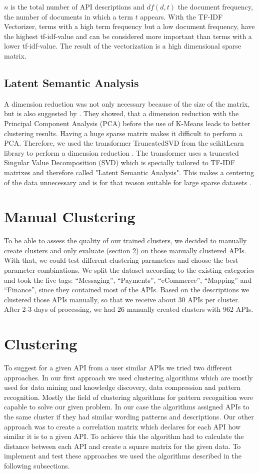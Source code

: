 \documentclass[a4paper]{IEEEtran}
\begin{document}
$n$ is the total number of API descriptions and $df(d,t)$ the document frequency, the number of documents in which a term $t$ appears. 
With the TF-IDF Vectorizer, terms with a high term frequency but a low document frequency, have the highest tf-idf-value and can be considered more important than terms with a lower tf-idf-value. The result of the vectorization is a high dimensional sparse matrix.

\subsection{Latent Semantic Analysis}
A dimension reduction was not only necessary because of the size of the matrix, but is also suggested by \cite{ding2004k}. They showed, that a dimension reduction with the Principal Component Analysis (PCA) before the use of K-Means leads to better clustering  results. Having a huge sparse matrix makes it difficult to perform a PCA. Therefore, we used the transformer TruncatedSVD from the scikitLearn library to perform a dimension reduction \cite{scikit-learn}. The transformer uses a truncated Singular Value Decomposition (SVD) which is specially tailored to TF-IDF matrixes and therefore called "Latent Semantic Analysis". This makes a centering of the data unnecessary and is for that reason suitable for large sparse datasets \cite{albright2004taming}.

\section{Manual Clustering}
To be able to assess the quality of our trained clusters, we decided to manually create clusters and only evaluate (section \ref{sec:clustering}) on those manually clustered APIs. With that, we could test different clustering parameters and choose the best parameter combinations. We split the dataset according to the existing categories and took the five tags: “Messaging”, “Payments”, “eCommerce”, “Mapping” and “Finance”, since they contained most of the APIs. Based on the descriptions we clustered those APIs manually, so that we receive about 30 APIs per cluster. After 2-3 days of processing, we had 26 manually created clusters with 962 APIs.

\section{Clustering}
\label{sec:clustering}
To suggest for a given API from a user similar APIs we tried two different approaches. In our first approach we used clustering algorithms which are mostly used for data mining and knowledge discovery, data compression and pattern recognition. Mostly the field of clustering algorithms for pattern recognition were capable to solve our given problem. In our case the algorithms assigned APIs to the same cluster if they had similar wording patterns and descriptions. 
Our other approach was to create a correlation matrix which declares for each API how similar it is to a given API. To achieve this the algorithm had to calculate the distance between each API and create a square matrix for the given data.
To implement and test these approaches we used the algorithms described in the following subsections.
\end{document}
